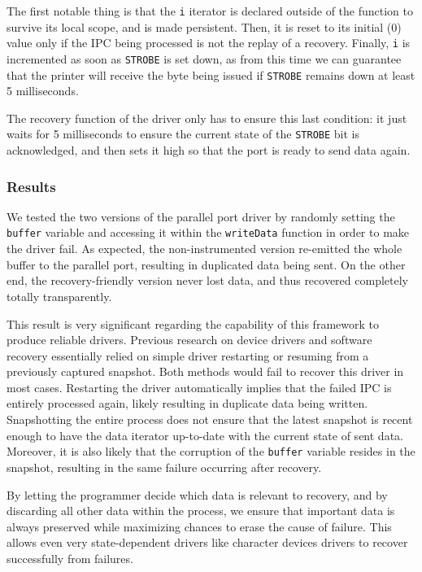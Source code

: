 \documentclass{report}
\begin{document}


The first notable thing is that the \texttt{i} iterator is declared outside of the function to survive its local scope, and is made persistent. Then, it is reset to its initial (0) value only if the IPC being processed is not the replay of a recovery. Finally, \texttt{i} is incremented as soon as \texttt{STROBE} is set down, as from this time we can guarantee that the printer will receive the byte being issued if \texttt{STROBE} remains down at least 5 milliseconds.

The recovery function of the driver only has to ensure this last condition: it just waits for 5 milliseconds to ensure the current state of the \texttt{STROBE} bit is acknowledged, and then sets it high so that the port is ready to send data again.

\subsubsection{Results}
We tested the two versions of the parallel port driver by randomly setting the \texttt{buffer} variable and accessing it within the \texttt{writeData} function in order to make the driver fail. As expected, the non-instrumented version re-emitted the whole buffer to the parallel port, resulting in duplicated data being sent. On the other end, the recovery-friendly version never lost data, and thus recovered completely totally transparently.

This result is very significant regarding the capability of this framework to produce reliable drivers. Previous research on device drivers and software recovery essentially relied on simple driver restarting or resuming from a previously captured snapshot. Both methods would fail to recover this driver in most cases. Restarting the driver automatically implies that the failed IPC is entirely processed again, likely resulting in duplicate data being written. Snapshotting the entire process does not ensure that the latest snapshot is recent enough to have the data iterator up-to-date with the current state of sent data. Moreover, it is also likely that the corruption of the \texttt{buffer} variable resides in the snapshot, resulting in the same failure occurring after recovery.

By letting the programmer decide which data is relevant to recovery, and by discarding all other data within the process, we ensure that important data is always preserved while maximizing chances to erase the cause of failure. This allows even very state-dependent drivers like character devices drivers to recover successfully from failures.
\end{document}
